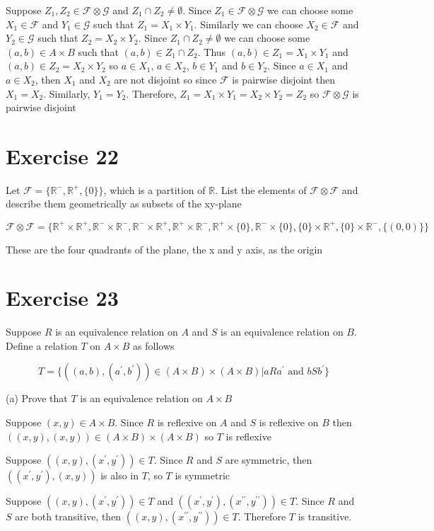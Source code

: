 \documentclass[11pt]{article}
\newcommand{\family}[1]{\mathcal{#1}}
\newcommand{\dprime}{{\prime \prime}}
\begin{document}
Suppose $Z_1, Z_2 \in \family{F} \otimes \family{G}$ and 
$Z_1 \cap Z_2 \neq \emptyset$. Since $Z_1 \in \family{F} \otimes \family{G}$ 
we can choose some $X_1 \in \family{F}$ and $Y_1 \in \family{G}$ such that 
$Z_1 = X_1 \times Y_1$. Similarly we can choose $X_2 \in \family{F}$ and 
$Y_2 \in \family{G}$ such that $Z_2 = X_2 \times Y_2$. Since 
$Z_1 \cap Z_2 \neq \emptyset$ we can choose some $(a, b) \in A \times B$ such that 
$(a,b) \in Z_1 \cap Z_2$. Thus $(a,b) \in Z_1 = X_1 \times Y_1$ and 
$(a,b) \in Z_2 = X_2 \times Y_2$ so $a \in X_1$, $a \in X_2$, $b \in Y_1$ and 
$b \in Y_2$. Since $a \in X_1$ and $a \in X_2$, then $X_1$ and $X_2$ are not 
disjoint so since $\family{F}$ is pairwise disjoint then $X_1 = X_2$. Similarly,
$Y_1 = Y_2$. Therefore, $Z_1 = X_1 \times Y_1 = X_2 \times Y_2 = Z_2$ so 
$\family{F} \otimes \family{G}$ is pairwise disjoint

\section*{Exercise 22}

Let $\family{F} = \{\mathbb{R}^-, \mathbb{R}^+, \{0\}\}$, which is a partition
of $\mathbb{R}$. List the elements of $\family{F} \otimes \family{F}$ and 
describe them geometrically as subsets of the xy-plane

$$\family{F} \otimes \family{F} = \{
\mathbb{R}^+ \times \mathbb{R}^+,
\mathbb{R}^- \times \mathbb{R}^-,
\mathbb{R}^- \times \mathbb{R}^+,
\mathbb{R}^+ \times \mathbb{R}^-,
\mathbb{R}^+ \times \{0\},
\mathbb{R}^- \times \{0\},
\{0\} \times \mathbb{R}^+,
\{0\} \times \mathbb{R}^-,
\{(0,0)\}
\}$$

These are the four quadrants of the plane, the x and y axis, as the origin

\section*{Exercise 23}

Suppose $R$ is an equivalence relation on $A$ and $S$ is an equivalence
relation on $B$. Define a relation $T$ on $A \times B$ as follows 

$$T = \{((a,b), (a^\prime, b^\prime)) \in (A \times B) \times (A \times B) |
aRa^\prime \text{ and } bSb^\prime\}$$

\noindent (a) Prove that $T$ is an equivalence relation on $A \times B$

Suppose $(x,y) \in A \times B$. Since $R$ is reflexive on $A$ and $S$ is reflexive
on $B$ then $((x,y),(x,y)) \in (A \times B) \times (A \times B)$ so $T$ is 
reflexive

Suppose $((x,y), (x^\prime, y^\prime)) \in T$. Since $R$ and $S$ are symmetric,
then $((x^\prime, y^\prime), (x,y))$ is also in $T$, so $T$ is symmetric

Suppose $((x,y), (x^\prime, y^\prime)) \in T$ and 
$((x^\prime, y^\prime), (x^\dprime, y^\dprime)) \in T$. Since $R$ and $S$ are
both transitive, then $((x,y), (x^\dprime, y^\dprime)) \in T$. Therefore
$T$ is transitive.
\end{document}
